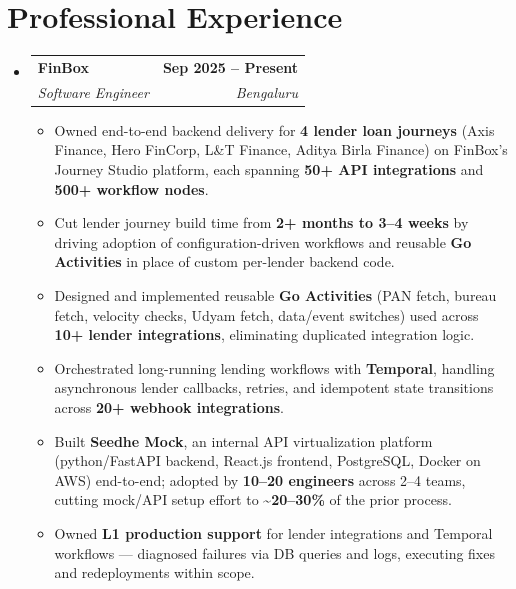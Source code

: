 \documentclass[letterpaper,11pt]{article}
\makeatletter
\newcommand{\resumeItem}[1]{\item\small{#1}}
\newcommand{\resumeSubheading}[4]{
\item
\begin{tabular*}{\textwidth}{l@{\extracolsep{\fill}}r}
\textbf{#1} & \textbf{\small #2}\\
\textit{\small #3} & \textit{\small #4}
\end{tabular*}\vspace{1pt}
}
\makeatother
\begin{document}
\section*{Professional Experience}
\begin{itemize}[leftmargin=0in,label={},topsep=3pt,itemsep=4pt]

\resumeSubheading{FinBox}{Sep 2025 -- Present}{Software Engineer}{Bengaluru}
\begin{itemize}[leftmargin=0.18in,topsep=3pt,itemsep=2pt,parsep=0pt]
  \resumeItem{Owned end-to-end backend delivery for \textbf{4 lender loan journeys} (Axis Finance, Hero FinCorp, L\&T Finance, Aditya Birla Finance) on FinBox's Journey Studio platform, each spanning \textbf{50+ API integrations} and \textbf{500+ workflow nodes}.}
  \resumeItem{Cut lender journey build time from \textbf{2+ months to 3--4 weeks} by driving adoption of configuration-driven workflows and reusable \textbf{Go Activities} in place of custom per-lender backend code.}
  \resumeItem{Designed and implemented reusable \textbf{Go Activities} (PAN fetch, bureau fetch, velocity checks, Udyam fetch, data/event switches) used across \textbf{10+ lender integrations}, eliminating duplicated integration logic.}
  \resumeItem{Orchestrated long-running lending workflows with \textbf{Temporal}, handling asynchronous lender callbacks, retries, and idempotent state transitions across \textbf{20+ webhook integrations}.}
  \resumeItem{Built \textbf{Seedhe Mock}, an internal API virtualization platform (python/FastAPI backend, React.js frontend, PostgreSQL, Docker on AWS) end-to-end; adopted by \textbf{10--20 engineers} across 2--4 teams, cutting mock/API setup effort to \textbf{\textasciitilde20--30\%} of the prior process.}
  \resumeItem{Owned \textbf{L1 production support} for lender integrations and Temporal workflows --- diagnosed failures via DB queries and logs, executing fixes and redeployments within scope.}
\end{itemize}


\end{itemize}
\end{document}
